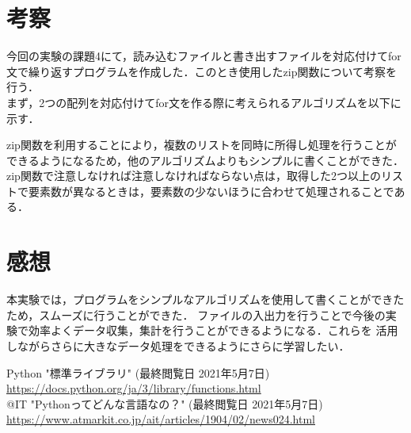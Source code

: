 \documentclass[a4paper,11pt]{jsarticle}
\begin{document}
\section{考察}
  今回の実験の課題4にて，読み込むファイルと書き出すファイルを対応付けてfor文で繰り返すプログラムを作成した．このとき使用したzip関数について考察を行う．\cite{zip}\\
  まず，2つの配列を対応付けてfor文を作る際に考えられるアルゴリズムを以下に示す．
  
  zip関数を利用することにより，複数のリストを同時に所得し処理を行うことができるようになるため，他のアルゴリズムよりもシンプルに書くことができた．
  zip関数で注意しなければ注意しなければならない点は，取得した2つ以上のリストで要素数が異なるときは，要素数の少ないほうに合わせて処理されることである．

  \section{感想}
  本実験では，プログラムをシンプルなアルゴリズムを使用して書くことができたため，スムーズに行うことができた．
  ファイルの入出力を行うことで今後の実験で効率よくデータ収集，集計を行うことができるようになる．これらを
  活用しながらさらに大きなデータ処理をできるようにさらに学習したい．
  
  \begin{thebibliography}{1}
     Python "標準ライブラリ" (最終閲覧日 2021年5月7日)\\ \url{https://docs.python.org/ja/3/library/functions.html}\\
     @IT "Pythonってどんな言語なの？" (最終閲覧日 2021年5月7日)\\ \url{https://www.atmarkit.co.jp/ait/articles/1904/02/news024.html}\\
  \end{thebibliography}
\end{document}
